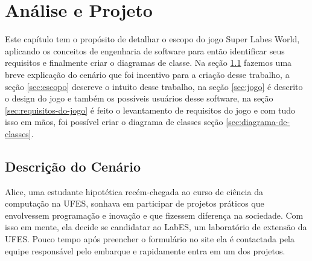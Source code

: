 \chapter{Análise e Projeto}
\label{sec-contribuicao}



Este capítulo tem o propósito de detalhar o escopo do jogo Super Labes World, aplicando os conceitos de engenharia de software para então identificar seus requisitos e finalmente criar o diagramas de classe. Na seção \ref{sec:descricao-do-cenario} fazemos uma breve explicação do cenário que foi incentivo para a criação desse trabalho, a seção \ref{sec:escopo} descreve o intuito desse trabalho, na seção \ref{sec:jogo} é descrito o design do jogo e também os possíveis usuários desse software, na seção \ref{sec:requisitos-do-jogo} é feito o levantamento de requisitos do jogo e com tudo isso em mãos, foi possível criar o diagrama de classes seção \ref{sec:diagrama-de-classes}.


\section{Descrição do Cenário}
\label{sec:descricao-do-cenario}
Alice, uma estudante hipotética recém-chegada ao curso de ciência da computação na UFES, sonhava em participar de projetos práticos que envolvessem programação e inovação e que fizessem diferença na sociedade. Com isso em mente, ela decide se candidatar ao LabES, um laboratório de extensão da UFES. Pouco tempo após preencher o formulário no site ela é contactada pela equipe responsável pelo embarque e rapidamente entra em um dos projetos.

